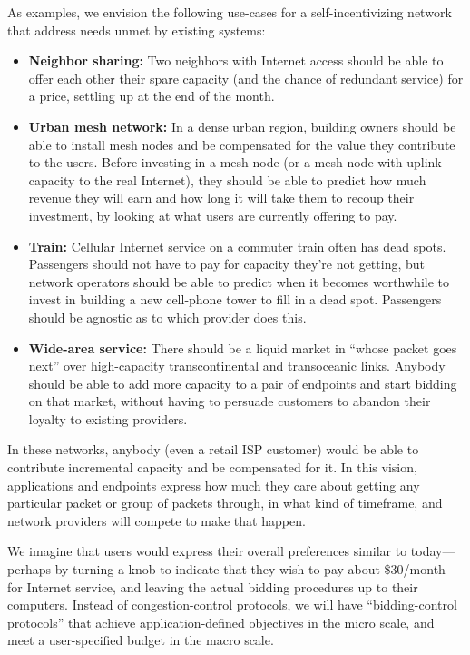 As examples, we envision the following use-cases for a
self-incentivizing network that address needs unmet by existing systems:

\begin{itemize}
\item \textbf{Neighbor sharing:} Two neighbors with Internet access
  should be able to offer each other their spare capacity (and the
  chance of redundant service) for a price, settling up at the end of
  the month.

\item \textbf{Urban mesh network:} In a dense urban region, building
  owners should be able to install mesh nodes and be compensated for
  the value they contribute to the users. Before investing in a mesh
  node (or a mesh node with uplink capacity to the real Internet),
  they should be able to predict how much revenue they will earn and
  how long it will take them to recoup their investment, by looking at
  what users are currently offering to pay.

\item \textbf{Train:} Cellular Internet service on a commuter train
  often has dead spots. Passengers should not have to pay for capacity
  they're not getting, but network operators should be able to
  predict when it becomes worthwhile to invest in building a new
  cell-phone tower to fill in a dead spot. Passengers should be
  agnostic as to which provider does this.

\item \textbf{Wide-area service:} There should be a liquid market in
  ``whose packet goes next'' over high-capacity
  transcontinental and transoceanic links. Anybody should be able to
  add more capacity to a pair of endpoints and start bidding on that
  market, without having to persuade customers to abandon their
  loyalty to existing providers.

\end{itemize}

In these networks, anybody (even a retail ISP customer) would be able
to contribute incremental capacity and be compensated for it. In this
vision, applications and endpoints express how much they care about
getting any particular packet or group of packets through, in what
kind of timeframe, and network providers will compete to make that
happen.

We imagine that users would express their overall preferences similar
to today---perhaps by turning a knob to indicate that they wish to pay about \$30/month
for Internet service, and leaving the actual bidding procedures up to
their computers. Instead of congestion-control protocols, we will have
``bidding-control protocols'' that achieve application-defined objectives in the
micro scale, and meet a user-specified budget in the macro scale.

